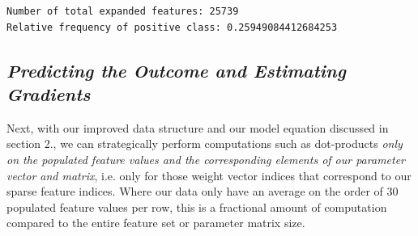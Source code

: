 \documentclass[11pt]{article}
\begin{document}
    \begin{Verbatim}[commandchars=\\\{\}]
Number of total expanded features: 25739
Relative frequency of positive class: 0.25949084412684253

    \end{Verbatim}

    \subsection{\texorpdfstring{\emph{Predicting the Outcome and Estimating
Gradients}}{Predicting the Outcome and Estimating Gradients}}\label{predicting-the-outcome-and-estimating-gradients}

Next, with our improved data structure and our model equation discussed
in section 2., we can strategically perform computations such as
dot-products \emph{only on the populated feature values and the
corresponding elements of our parameter vector and matrix}, i.e. only
for those weight vector indices that correspond to our sparse feature
indices. Where our data only have an average on the order of 30
populated feature values per row, this is a fractional amount of
computation compared to the entire feature set or parameter matrix size.
\end{document}
